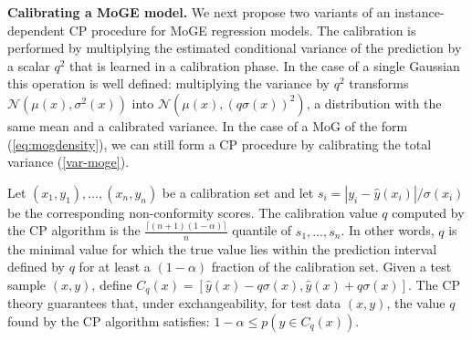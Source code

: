 

{\bf Calibrating a MoGE model. } 
We next propose two variants of an instance-dependent CP procedure for MoGE regression models. The calibration is performed by multiplying the estimated conditional variance of the prediction by a scalar $q^2$ that is learned in a calibration phase. In the case of a single Gaussian this operation is well defined: multiplying the variance by $q^2$ transforms $\mathcal{N}(\mu(x),\sigma^2(x))$ into $\mathcal{N}(\mu(x),(q\sigma(x))^2)$, a distribution with the same mean and a calibrated variance. In the case of a MoG of the form (\ref{eq:mogdensity}), we can still form a CP procedure by calibrating the total variance (\ref{var-moge}).    

Let $(x_1,y_1),...,(x_n,y_n)$ be a calibration set and let $s_i = |y_i-\hat{y}(x_i)|/\sigma(x_i)$ be the corresponding non-conformity scores.  The calibration value $q$ computed by the CP algorithm is the  $\frac{\lceil(n+1)(1-\alpha)\rceil}{n}$ quantile of $s_1,...,s_n$.
 In other words, $q$ is the minimal value for which the true value lies within the prediction interval defined by $q$ for at least a  $(1 - \alpha)$ fraction of the calibration set.
Given a test sample $(x,y)$, define $C_q(x)=[\hat{y}(x)-q\sigma(x),\hat{y}(x)+q\sigma(x)]$.
  The CP theory \cite{vovk2005conformal}  guarantees that, under exchangeability, for  test data $(x,y)$, the value $q$ found by the CP algorithm satisfies:
$1-\alpha \le p(y\in C_q(x))$. 

